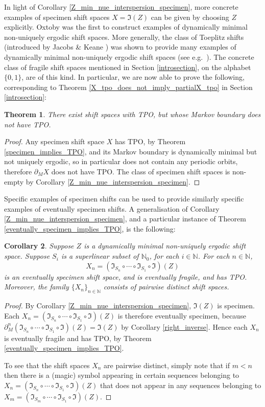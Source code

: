 \documentclass[reqno,11pt]{amsart}
\newtheorem{thm}{Theorem}[section]
\newtheorem{cor}[thm]{Corollary}
\theoremstyle{definition}
\theoremstyle{remark}
\theoremstyle{remark}
\def \N {\mathbb N}
\def\i{\mathfrak{I}}
\numberwithin{equation}{section}
\begin{document}
In light of Corollary \ref{Z_min_nue_interspersion_specimen},
more concrete examples of specimen shift spaces  $X=\i(Z)$ can be given by choosing $Z$ explicitly.
Oxtoby \cite{oxtoby} was the first to construct examples of dynamically minimal non-uniquely ergodic shift spaces.
More generally, the class of Toeplitz shifts (introduced by Jacobs \& Keane \cite{jacobskeane})
was shown to provide many examples of dynamically minimal non-uniquely ergodic shift spaces
(see e.g.~\cite{downarowicz, markleypaul, williams}).
The concrete class of fragile shift spaces mentioned in Section \ref{introsection}, on the alphabet $\{0,1\}$,
are of this kind.
In particular, we are now able 
to prove the following, corresponding to Theorem \ref{X_tpo_does_not_imply_partialX_tpo} in Section \ref{introsection}: 

\begin{thm}
There exist shift spaces with TPO, but whose Markov boundary does not have TPO.
\end{thm}
\begin{proof}
Any specimen shift space $X$ has TPO, by
Theorem \ref{specimen_implies_TPO},
and its Markov boundary is dynamically minimal but not uniquely ergodic, so in particular does not contain any periodic orbits,
therefore $\partial_M X$ does not have TPO.
The class of specimen shift spaces is non-empty by 
Corollary \ref{Z_min_nue_interspersion_specimen}.
\end{proof}

Specific examples of specimen shifts can be used to provide similarly specific examples of eventually specimen shifts.
A generalisation of Corollary \ref{Z_min_nue_interspersion_specimen},
and a particular instance of Theorem \ref{eventually_specimen_implies_TPO}, is the following:


\begin{cor}
Suppose $Z$ is a dynamically minimal non-uniquely ergodic shift space.
Suppose $S_i$ is a superlinear subset of $\N_0$, for each $ i\in\N$.
For each $n\in\N$,
$$X_n= (\i_{S_n} \circ \cdots \circ \i_{S_1}\circ \i) (Z)$$ 
is an eventually specimen shift space,
and is eventually fragile, and has TPO.
Moreover, the family $\{X_n\}_{n\in\N}$ consists of pairwise distinct shift spaces.
\end{cor}
\begin{proof}
By Corollary \ref{Z_min_nue_interspersion_specimen}, $\i(Z)$ is specimen.
Each $X_n= (\i_{S_n} \circ \cdots \circ \i_{S_1}\circ \i) (Z)$
is therefore eventually specimen, because
$\partial_M^n (\i_{S_n} \circ \cdots \circ \i_{S_1}\circ \i) (Z) =\i(Z)$ 
by Corollary \ref{right_inverse}. 
Hence each $X_n$ is eventually fragile and has TPO, by Theorem \ref{eventually_specimen_implies_TPO}.

To see that the shift spaces $X_n$ are pairwise distinct,
simply note that if $m<n$ then there is a (magic) symbol appearing in certain sequences belonging to
$X_n= (\i_{S_n} \circ \cdots \circ \i_{S_1}\circ \i) (Z)$
that does not appear in any sequences belonging to
$X_m= (\i_{S_m} \circ \cdots \circ \i_{S_1}\circ \i) (Z)$.
\end{proof}
\end{document}
